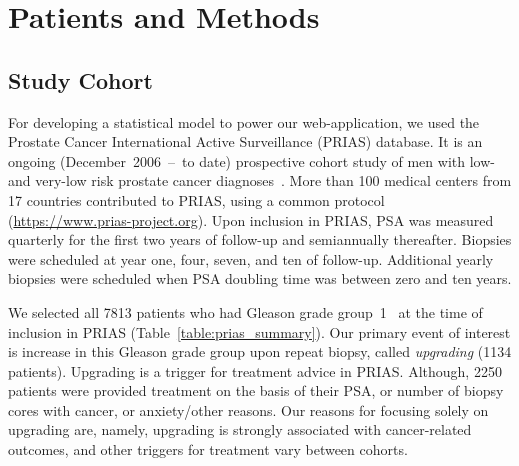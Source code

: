 \section{Patients and Methods}

\subsection{Study Cohort}
\label{subsec:cohort}
For developing a statistical model to power our web-application, we used the Prostate Cancer International Active Surveillance (PRIAS) database. It is an ongoing (December~2006~--~to date) prospective cohort study of men with low- and very-low risk prostate cancer diagnoses~\citep{bul2013active}. More than 100 medical centers from 17 countries contributed to PRIAS, using a common protocol (\url{https://www.prias-project.org}). Upon inclusion in PRIAS, PSA was measured quarterly for the first two years of follow-up and semiannually thereafter. Biopsies were scheduled at year one, four, seven, and ten of follow-up. Additional yearly biopsies were scheduled when PSA doubling time was between zero and ten years.

We selected all 7813 patients who had Gleason grade group~1~\citep{epsteinGG2014} at the time of inclusion in PRIAS (Table~\ref{table:prias_summary}). Our primary event of interest is increase in this Gleason grade group upon repeat biopsy, called \textit{upgrading} (1134 patients). Upgrading is a trigger for treatment advice in PRIAS. Although, 2250 patients were provided treatment on the basis of their PSA, or number of biopsy cores with cancer, or anxiety/other reasons. Our reasons for focusing solely on upgrading are, namely, upgrading is strongly associated with cancer-related outcomes, and other triggers for treatment vary between cohorts.

